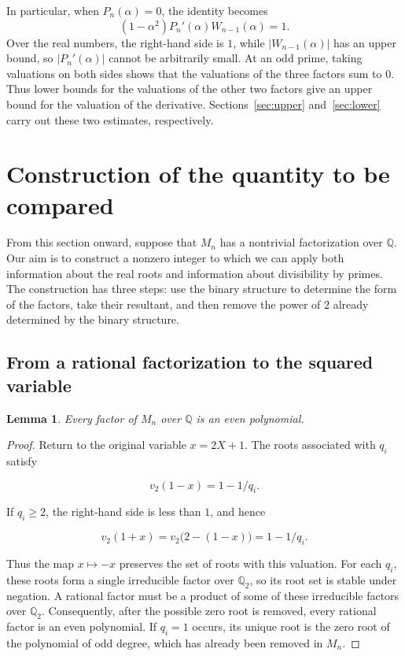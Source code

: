 \documentclass[11pt,a4paper]{article}
\numberwithin{equation}{section}
\newtheorem{lemma}[theorem]{Lemma}
\theoremstyle{definition}
\begin{document}
In particular, when \(P_n(\alpha)=0\), the identity becomes
\begin{equation}\label{eq:root_identity}
(1-\alpha^2)P_n'(\alpha)W_{n-1}(\alpha)=1.
\end{equation}
Over the real numbers, the right-hand side is \(1\), while \(|W_{n-1}(\alpha)|\) has an upper bound, so \(|P_n'(\alpha)|\) cannot be arbitrarily small. At an odd prime, taking valuations on both sides shows that the valuations of the three factors sum to \(0\). Thus lower bounds for the valuations of the other two factors give an upper bound for the valuation of the derivative. Sections~\ref{sec:upper} and~\ref{sec:lower} carry out these two estimates, respectively.

\section{Construction of the quantity to be compared}\label{sec:construction}

From this section onward, suppose that \(M_n\) has a nontrivial factorization over \(\mathbb Q\). Our aim is to construct a nonzero integer to which we can apply both information about the real roots and information about divisibility by primes. The construction has three steps: use the binary structure to determine the form of the factors, take their resultant, and then remove the power of \(2\) already determined by the binary structure.

\subsection{From a rational factorization to the squared variable}

\begin{lemma}\label{lem:even}
Every factor of \(M_n\) over \(\mathbb Q\) is an even polynomial.
\end{lemma}

\begin{proof}
Return to the original variable \(x=2X+1\). The roots associated with \(q_i\) satisfy

\begin{equation}
v_2(1-x)=1-1/q_i.
\label{eq:old2.2}
\end{equation}

If \(q_i\ge2\), the right-hand side is less than \(1\), and hence

\[
v_2(1+x)=v_2\bigl(2-(1-x)\bigr)=1-1/q_i.
\]

Thus the map \(x\mapsto-x\) preserves the set of roots with this valuation. For each \(q_i\), these roots form a single irreducible factor over \(\mathbb Q_2\), so its root set is stable under negation. A rational factor must be a product of some of these irreducible factors over \(\mathbb Q_2\). Consequently, after the possible zero root is removed, every rational factor is an even polynomial. If \(q_i=1\) occurs, its unique root is the zero root of the polynomial of odd degree, which has already been removed in \(M_n\).
\end{proof}
\end{document}
